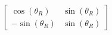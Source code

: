 \documentclass[preview]{standalone}
\begin{document}
\begin{align*}
\begin{bmatrix} \cos(\theta_R) &  \sin(\theta_R)\\ -\sin(\theta_R) & \sin(\theta_R) \end{bmatrix}
\end{align*}
\end{document}
